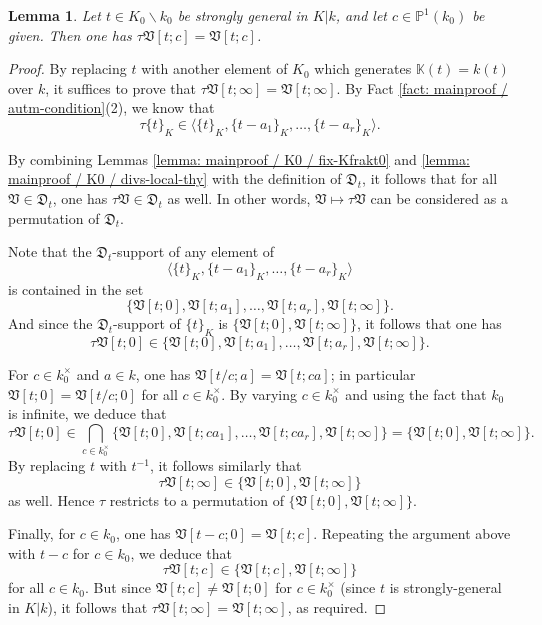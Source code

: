 \documentclass[11pt]{amsart}
\newtheorem{lemma}[proposition]{Lemma}
\theoremstyle{definition}
\theoremstyle{remark}
\numberwithin{equation}{section}
\newcommand{\Pbb}{\mathbb{P}}
\newcommand{\Kbb}{\mathbb{K}}
\newcommand{\Dfrak}{\mathfrak{D}}
\newcommand{\Vfrak}{\mathfrak{V}}
\begin{document}
\begin{lemma}
\label{lemma: mainproof / K0 / fix-K0-strgen-divs}
  Let $t \in K_0 \smallsetminus k_0$ be strongly general in $K|k$, and let $c \in \Pbb^1(k_0)$ be given.
  Then one has $\tau\Vfrak[t;c] = \Vfrak[t;c]$.
\end{lemma}
\begin{proof}
  By replacing $t$ with another element of $K_0$ which generates $\Kbb(t) = k(t)$ over $k$, it suffices to prove that $\tau\Vfrak[t;\infty] = \Vfrak[t;\infty]$.
   By Fact \ref{fact: mainproof / autm-condition}(2), we know that
   \[ \tau\{t\}_K \in \langle\{t\}_K,\{t-a_1\}_K,\ldots,\{t-a_r\}_K \rangle. \]

   By combining Lemmas \ref{lemma: mainproof / K0 / fix-Kfrakt0} and \ref{lemma: mainproof / K0 / divs-local-thy} with the definition of $\Dfrak_t$, it follows that for all $\Vfrak \in \Dfrak_t$, one has $\tau \Vfrak \in \Dfrak_t$ as well.
   In other words, $\Vfrak \mapsto \tau\Vfrak$ can be considered as a permutation of $\Dfrak_t$.

   Note that the $\Dfrak_t$-support of any element of
   \[ \langle\{t\}_K,\{t-a_1\}_K,\ldots,\{t-a_r\}_K \rangle\]
   is contained in the set
   \[ \{\Vfrak[t;0],\Vfrak[t;a_1],\ldots,\Vfrak[t;a_r],\Vfrak[t;\infty]\}. \]
   And since the $\Dfrak_t$-support of $\{t\}_K$ is $\{\Vfrak[t;0],\Vfrak[t;\infty]\}$, it follows that one has
   \[ \tau\Vfrak[t;0] \in \{\Vfrak[t;0],\Vfrak[t;a_1],\ldots,\Vfrak[t;a_r],\Vfrak[t;\infty]\}.\]

   For $c \in k_0^\times$ and $a \in k$, one has $\Vfrak[t/c;a] = \Vfrak[t;ca]$; in particular $\Vfrak[t;0] = \Vfrak[t/c;0]$ for all $c \in k_0^\times$.
   By varying $c \in k_0^\times$ and using the fact that $k_0$ is infinite, we deduce that
   \[ \tau\Vfrak[t;0] \in \bigcap_{c \in k_0^\times}  \{\Vfrak[t;0],\Vfrak[t;ca_1],\ldots,\Vfrak[t;ca_r],\Vfrak[t;\infty]\} = \{\Vfrak[t;0],\Vfrak[t;\infty]\}. \]
   By replacing $t$ with $t^{-1}$, it follows similarly that
   \[ \tau\Vfrak[t;\infty] \in \{\Vfrak[t;0],\Vfrak[t;\infty]\}\]
   as well.
   Hence $\tau$ restricts to a permutation of $\{\Vfrak[t;0],\Vfrak[t;\infty]\}$.

   Finally, for $c \in k_0$, one has $\Vfrak[t-c;0] = \Vfrak[t;c]$.
   Repeating the argument above with $t-c$ for $c \in k_0$, we deduce that
   \[ \tau\Vfrak[t;c] \in \{\Vfrak[t;c],\Vfrak[t;\infty]\}\]
   for all $c \in k_0$.
   But since $\Vfrak[t;c] \neq \Vfrak[t;0]$ for $c \in k_0^\times$ (since $t$ is strongly-general in $K|k$), it follows that $\tau\Vfrak[t;\infty] = \Vfrak[t;\infty]$, as required.
\end{proof}
\end{document}
